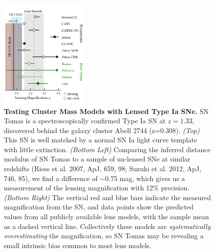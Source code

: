 \documentclass[12pt]{article}
\begin{document}
\begin{figure}
  \includegraphics[width=0.39\textwidth]{FIG/snTomas_magnifications.pdf}
\caption{ \label{fig:tomas} \small {\bf Testing Cluster Mass Models
    with Lensed Type Ia SNe.}  SN Tomas is a spectroscopically confirmed
  Type Ia SN at $z=1.33$, discovered behind the galaxy cluster Abell
  2744 (z=0.308).  {\it(Top)} This SN is well matched by a normal
  SN Ia light curve template with little extinction.  {\it(Bottom
    Left)} Comparing the inferred distance modulus of SN Tomas to a
  sample of un-lensed SNe at similar redshifts (Riess et al. 2007,
  ApJ, 659, 98; Suzuki et al. 2012, ApJ, 746, 85), we find a
  difference of $\sim$0.75 mag, which gives us a measurement of the
  lensing magnification with 12\% precision.  {\it (Bottom Right)} The
  vertical red and blue bars indicate the measured magnification from
  the SN, and data points show the predicted values from all publicly
  available lens models, with the sample mean as a dashed vertical
  line. Collectively these models are {\it systematically
    overestimating} the magnification, so SN Tomas may be revealing a
  small intrinsic bias common to most lens models. }
\end{figure}
\end{document}
